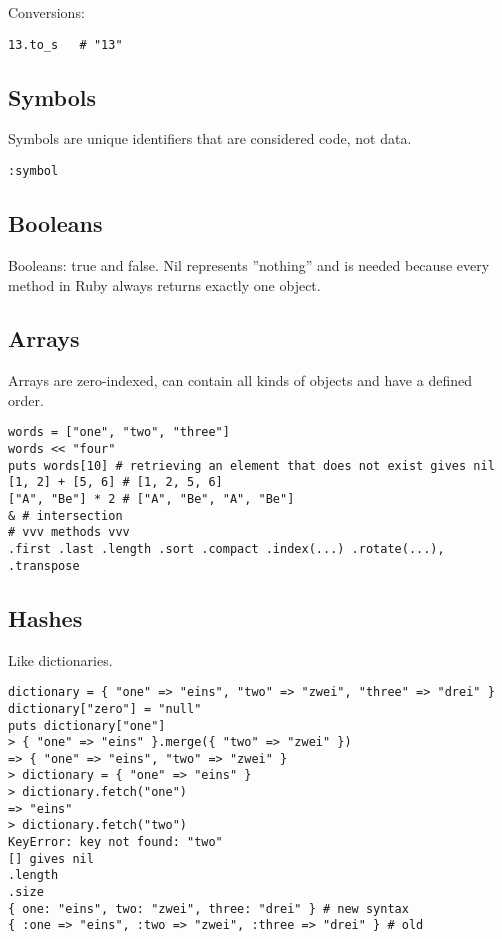 \documentclass{charun}
\begin{document}
\begin{multicols*}{2}
Conversions:
\begin{verbatim}
13.to_s   # "13"
\end{verbatim}

\subsection{Symbols}
Symbols are unique identifiers that are considered code, not data. 
\begin{verbatim}
:symbol
\end{verbatim}

\subsection{Booleans}
Booleans: true and false.
Nil represents ''nothing'' and is needed because every method in Ruby always returns exactly one object.

\subsection{Arrays}
Arrays are zero-indexed, can contain all kinds of objects and have a defined order.
\begin{verbatim}
words = ["one", "two", "three"]
words << "four"
puts words[10] # retrieving an element that does not exist gives nil
[1, 2] + [5, 6] # [1, 2, 5, 6]
["A", "Be"] * 2 # ["A", "Be", "A", "Be"]
& # intersection
# vvv methods vvv
.first .last .length .sort .compact .index(...) .rotate(...), .transpose
\end{verbatim}


\subsection{Hashes}
Like dictionaries.
\begin{verbatim}
dictionary = { "one" => "eins", "two" => "zwei", "three" => "drei" }
dictionary["zero"] = "null"
puts dictionary["one"]
> { "one" => "eins" }.merge({ "two" => "zwei" })
=> { "one" => "eins", "two" => "zwei" }
> dictionary = { "one" => "eins" }
> dictionary.fetch("one")
=> "eins"
> dictionary.fetch("two")
KeyError: key not found: "two"
[] gives nil
.length
.size
{ one: "eins", two: "zwei", three: "drei" } # new syntax
{ :one => "eins", :two => "zwei", :three => "drei" } # old
\end{verbatim}


\end{multicols*}
\end{document}
